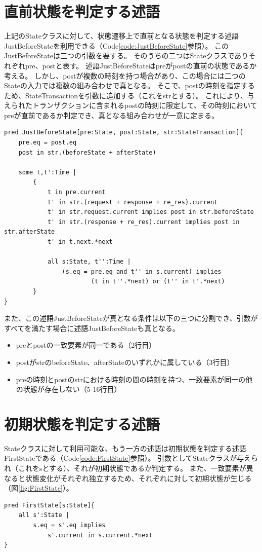 \documentclass[12pt,a4paper]{jbook}
\begin{document}
\color{red}
\section{直前状態を判定する述語}
上記のStateクラスに対して、状態遷移上で直前となる状態を判定する述語JustBeforeStateを利用できる（Code\ref{code:JustBeforeState}参照）。
このJustBeforeStateは三つの引数を要する。
そのうちの二つはStateクラスでありそれぞれpre、postと表す。
述語JustBeforeStateはpreがpostの直前の状態であるか考える。
しかし、postが複数の時刻を持つ場合があり、この場合には二つのStateの入力では複数の組み合わせで真となる。
そこで、postの時刻を指定するため、StateTransactionを引数に追加する（これをstrとする）。
これにより、与えられたトランザクションに含まれるpostの時刻に限定して、その時刻においてpreが直前であるか判定でき、真となる組み合わせが一意に定まる。
\begin{lstlisting}[caption=状態遷移において直前の状態を判定する述語, label=code:JustBeforeState]
pred JustBeforeState[pre:State, post:State, str:StateTransaction]{
	pre.eq = post.eq
	post in str.(beforeState + afterState)

	some t,t':Time |
		{
			t in pre.current
			t' in str.(request + response + re_res).current
			t' in str.request.current implies post in str.beforeState
			t' in str.(response + re_res).current implies post in str.afterState
			t' in t.next.*next

			all s:State, t'':Time |
				(s.eq = pre.eq and t'' in s.current) implies
						(t in t''.*next) or (t'' in t'.*next)
		}
}
\end{lstlisting}

また、この述語JustBeforeStateが真となる条件は以下の三つに分割でき、引数がすべてを満たす場合に述語JustBeforeStateも真となる。
\begin{itemize}
\item preとpostの一致要素が同一である（2行目）
\item postがstrのbeforeState、afterStateのいずれかに属している（3行目）
\item preの時刻とpostのstrにおける時刻の間の時刻を持つ、一致要素が同一の他の状態が存在しない（5-16行目）
\end{itemize}

\section{初期状態を判定する述語}
Stateクラスに対して利用可能な、もう一方の述語は初期状態を判定する述語FirstStateである（Code\ref{code:FirstState}参照）。
引数としてStateクラスが与えられ（これをsとする）、それが初期状態であるか判定する。
また、一致要素が異なると状態変化がそれぞれ独立するため、それぞれに対して初期状態が生じる（図\ref{fig:FirstState}）。
\begin{lstlisting}[caption=状態遷移において初期状態を判定する述語, label=code:FirstState]
pred FirstState[s:State]{
	all s':State |
		s.eq = s'.eq implies
			s'.current in s.current.*next
}
\end{lstlisting}
\end{document}
